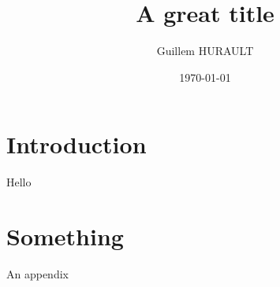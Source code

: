 \documentclass[a4paper, english, abstracton, 12pt]{scrartcl}
\title{A great title}
\author{Guillem HURAULT}
\date{\today}
\begin{document}
\begin{spacing}{1.1}
\setlength{\parskip}{12pt}

\maketitle

\setcounter{tocdepth}{2}
\tableofcontents

\pagebreak

% 
\section{Introduction}

Hello

\clearpage
\appendix
{}
\appendixpage
% 

\section{Something}

An appendix

\clearpage

\small
% 

\end{spacing}
\end{document}
